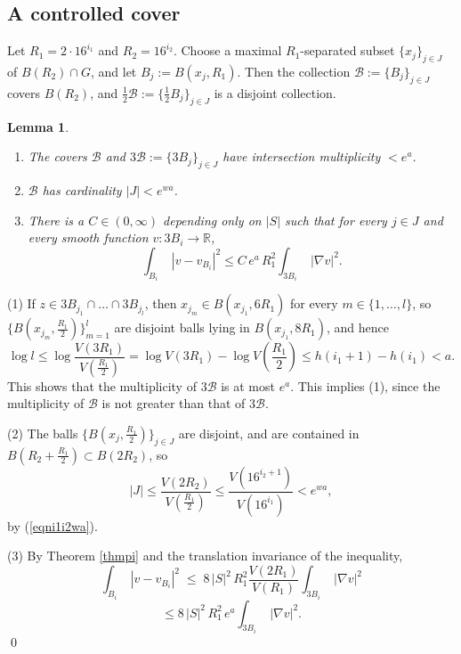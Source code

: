 \documentclass[12pt]{amsart}
\numberwithin{equation}{section}
\theoremstyle{plain}
\newtheorem{lemma}[equation]{Lemma}
\theoremstyle{remark}
\theoremstyle{definition}
\newcommand{\ra}{\rightarrow}
\newcommand{\B}{{\mathcal B}}
\newcommand{\R}{\mathbb R}
\def\ra{\rightarrow}
\def\defeq{:=}
\begin{document}
\subsection{A controlled cover} 
Let $R_1=2\cdot 16^{i_1}$ and $R_2=16^{i_2}$.
Choose  a maximal $R_1$-separated subset $\{x_j\}_{j\in J}$ 
of $B(R_2)\cap G$, and let $B_j\defeq B(x_j,R_1)$.  Then the
collection $\B\defeq \{B_j\}_{j\in J}$ covers $B(R_2)$,
and $\frac12\B\defeq\{\frac12 B_j\}_{j\in J}$ is a
disjoint collection.  

\begin{lemma}
\label{lembmisc}
\begin{enumerate}
\item The covers $\B$ and 
$3\B\defeq \{3B_j\}_{j\in J}$ have
 intersection multiplicity $<e^a$.

\item $\B$ has cardinality $|J|<e^{wa}$.

\item There is a $C\in (0,\infty)$ depending only
on $|S|$ such that
for every  $j\in J$ and every smooth function 
$v:3B_i\ra \R$,
\begin{equation}
\int_{B_i}\;|v-v_{B_i}|^2\leq C\,e^a\,R_1^2
\int_{3B_i}\;|\nabla v|^2.
\end{equation} 
\end{enumerate}
\end{lemma}
\proof


(1)  If $z\in 3B_{j_1}\cap\ldots\cap 3B_{j_l}$,
then $x_{j_m}\in B(x_{j_1},6R_1)$ for every $m\in \{1,\ldots,l\}$,
so $\{B(x_{j_m},\frac{R_1}{2})\}_{m=1}^l$ are disjoint balls
lying in $B(x_{j_1},8R_1)$, and hence 
$$
\log l\leq \log\frac{V(3R_1)}{V(\frac{R_1}{2})}
=\log V(3R_1)-\log V\left(\frac{R_1}{2}\right)
\leq h(i_1+1)-h(i_1)<a.$$
This shows that the multiplicity of $3\B$ is  at most
$e^a$.  This implies (1), since the multiplicity of 
$\B$ is not greater than that of $3\B$.

\bigskip
(2)  The balls $\{B(x_j,\frac{R_1}{2})\}_{j\in J}$
are disjoint, and are contained in $B(R_2+\frac{R_1}{2})\subset
B(2R_2)$, so 
$$
|J|\leq \frac{V(2R_2)}{ V(\frac{R_1}{2})}\leq 
\frac{V(16^{i_2+1})}{V(16^{i_1})}< e^{wa},$$
by (\ref{eqni1i2wa}).



\bigskip
(3)  By Theorem \ref{thmpi} and the translation invariance
of the inequality, 
$$
\int_{B_i}\;|v-v_{B_i}|^2
\;\leq\; 8\,|S|^2\,R_1^2\frac{V(2R_1)}{V(R_1)}
\int_{3B_i}\;|\nabla v|^2
$$
$$
\leq 8\,|S|^2\,R_1^2\,e^a
\int_{3B_i}\;|\nabla v|^2.
$$
\qed
\end{document}
